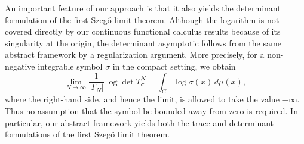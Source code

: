 \documentclass{amsart}
\theoremstyle{definition}
\theoremstyle{remark}
\numberwithin{equation}{section}
\begin{document}
An important feature of our approach is that it also yields the
determinant formulation of the first Szeg\H{o} limit theorem.  Although
the logarithm is not covered directly by our continuous functional
calculus results because of its singularity at the origin, the
determinant asymptotic follows from the same abstract framework by a
regularization argument.  More precisely, for a non-negative
integrable symbol $\sigma$ in the compact setting, we obtain
\[ \lim_{N\to\infty} \frac{1}{|\Gamma_N|} \log\det T_\sigma^N = \int_G \log\sigma(x)\,d\mu(x), \]
where the right-hand side, and hence the limit, is allowed to take the
value $-\infty$.  Thus no assumption that the symbol be bounded away
from zero is required.  In particular, our abstract framework yields
both the trace and determinant formulations of the first Szeg\H{o}
limit theorem.



\end{document}
